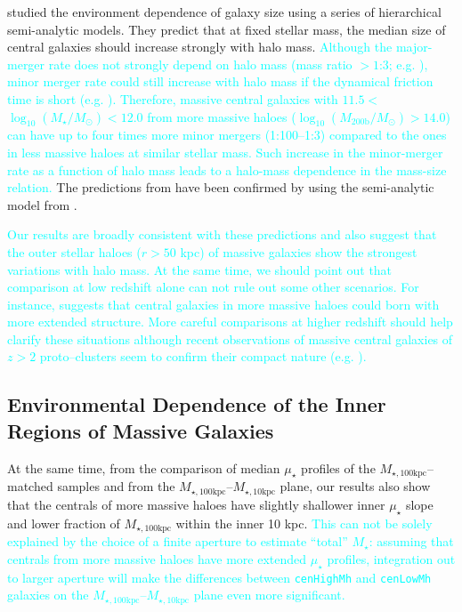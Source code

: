 \documentclass[a4paper,fleqn,usenatbib]{mnras}
\def\rbcg{\texttt{cenHighMh}}
\def\nbcg{\texttt{cenLowMh}}
\def\mstar{{$M_{\star}$}}
\def\logms{{$\log_{10} (M_{\star}/M_{\odot})$}}
\def\logmh{{$\log_{10} (M_{\mathrm{200b}}/M_{\odot})$}}
\def\minn{{$M_{\star,10\mathrm{kpc}}$}}
\def\mtot{{$M_{\star,100\mathrm{kpc}}$}}
\def\mden{{$\mu_{\star}$}}
\newcommand{\song}[1]{\textcolor{cyan}{#1}}
\begin{document}
    \citet{Shankar2014} studied the environment dependence of galaxy size using 
    a series of hierarchical semi-analytic models. 
    They predict that at fixed stellar mass, the median size of central galaxies 
    should increase strongly with halo mass. 
    \song{
    Although the major-merger rate does not strongly depend on halo mass 
    (mass ratio $>1$:3; e.g. \citealt{Hirschmann2013, Shankar2015}), minor 
    merger rate could still increase with halo mass if the dynamical friction time 
    is short (e.g. \citealt{Newman2012}). 
    Therefore, massive central galaxies with $11.5 <$\logms{}$<12.0$ from more massive 
    haloes (\logmh{}$>14.0$) can have up to four times more minor mergers (1:100--1:3)
    compared to the ones in less massive haloes at similar stellar mass. 
    Such increase in the minor-merger rate as a function of halo mass leads to a 
    halo-mass dependence in the mass-size relation. 
    }
    The predictions from \citet{Shankar2014} have been confirmed by \citet{Yoon2017} 
    using the semi-analytic model from \citet{Guo2011}.  
    
    \song{
    Our results are broadly consistent with these predictions and also suggest that 
    the outer stellar haloes ($r>50$ kpc) of massive galaxies show the strongest 
    variations with halo mass. 
    At the same time, we should point out that comparison at low redshift alone 
    can not rule out some other scenarios.  
    For instance, \citet{Buchan2016} suggests that central galaxies in more massive 
    haloes could born with more extended structure. 
    More careful comparisons at higher redshift should help clarify these situations
    although recent observations of massive central galaxies of $z>2$ proto--clusters 
    seem to confirm their compact nature (e.g. \citealt{Kubo2017}).
    }
   
\subsection{Environmental Dependence of the Inner Regions of Massive Galaxies}
    
    At the same time, from the comparison of median \mden{} profiles of the 
    \mtot{}--matched samples and from the \mtot{}--\minn{} plane, our results also 
    show that the centrals of more massive haloes have slightly shallower inner 
    \mden{} slope and lower fraction of \mtot{} within the inner 10 kpc.
    \song{
    This can not be solely explained by the choice of a finite aperture to 
    estimate ``total'' \mstar{}: assuming that centrals from more massive haloes 
    have more extended \mden{} profiles, integration out to larger aperture will 
    make the differences between \rbcg{} and \nbcg{} galaxies on the \mtot{}--\minn{} 
    plane even more significant.
    }
    
\end{document}

